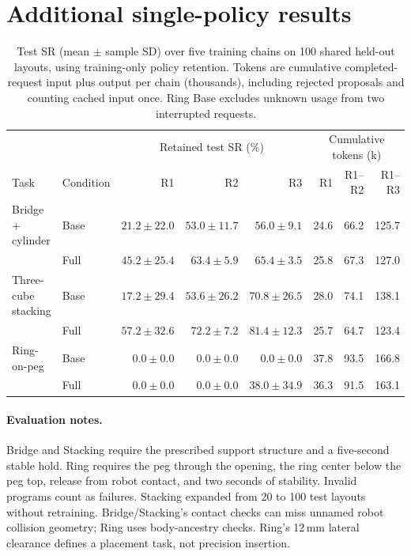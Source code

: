 \section{Additional single-policy results}
\label{app:single-policy-details}

\begin{table}[t]
  \centering
  \small
  \setlength{\tabcolsep}{5pt}
  \begin{tabular}{llrrrrrr}
    \hline
    & & \multicolumn{3}{c}{Retained test SR (\%)}
      & \multicolumn{3}{c}{Cumulative tokens (k)} \\
    Task & Condition & R1 & R2 & R3 & R1 & R1--R2 & R1--R3 \\
    \hline
    Bridge + cylinder & Base & $21.2 \pm 22.0$ & $53.0 \pm 11.7$ & $56.0 \pm 9.1$ & 24.6 & 66.2 & 125.7 \\
     & Full & $45.2 \pm 25.4$ & $63.4 \pm 5.9$ & $65.4 \pm 3.5$ & 25.8 & 67.3 & 127.0 \\
    \hline
    Three-cube stacking & Base & $17.2 \pm 29.4$ & $53.6 \pm 26.2$ & $70.8 \pm 26.5$ & 28.0 & 74.1 & 138.1 \\
     & Full & $57.2 \pm 32.6$ & $72.2 \pm 7.2$ & $81.4 \pm 12.3$ & 25.7 & 64.7 & 123.4 \\
    \hline
    Ring-on-peg & Base & $0.0 \pm 0.0$ & $0.0 \pm 0.0$ & $0.0 \pm 0.0$ & 37.8 & 93.5 & 166.8 \\
     & Full & $0.0 \pm 0.0$ & $0.0 \pm 0.0$ & $38.0 \pm 34.9$ & 36.3 & 91.5 & 163.1 \\
    \hline
  \end{tabular}
  \caption{Test SR (mean $\pm$ sample SD) over five training chains on 100
  shared held-out layouts, using training-only policy retention. Tokens are
  cumulative completed-request input plus output per chain (thousands), including
  rejected proposals and counting cached input once. Ring Base excludes unknown
  usage from two interrupted requests.}
  \label{tab:single-policy-results}
\end{table}

\paragraph{Evaluation notes.}
Bridge and Stacking require the prescribed support structure and a five-second
stable hold. Ring requires the peg through the opening, the ring center below
the peg top, release from robot contact, and two seconds of stability. Invalid
programs count as failures. Stacking expanded from 20 to 100 test layouts without
retraining. Bridge/Stacking's contact checks can miss unnamed robot collision
geometry; Ring uses body-ancestry checks. Ring's 12\,mm lateral clearance defines
a placement task, not precision insertion.
